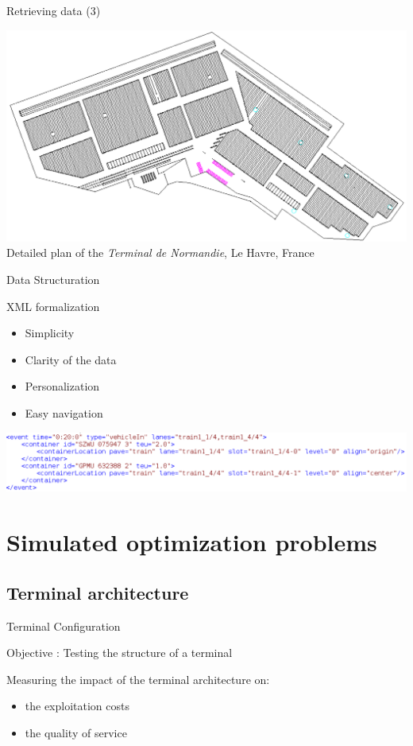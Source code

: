 \documentclass{beamer}
\begin{document}
\begin{frame}{Retrieving data (3)}
   \begin{center}
      \includegraphics[height=.70\textheight]{fig/planTerminalDetailleBlanc.png} \\
       \tiny Detailed plan of the \textit{Terminal de Normandie}, Le Havre, France
    \end{center}
\end{frame} 

\begin{frame}{Data Structuration}
  \begin{block}{XML formalization}
    \begin{itemize}
      \item Simplicity
      \item Clarity of the data
      \item Personalization
      \item Easy navigation
    \end{itemize}
   \end{block}
   
  \begin{center}   
    \includegraphics[width=.90\textwidth]{fig/structureXML.png}
   \end{center}
\end{frame}


\section{Simulated optimization problems}
\subsection*{Terminal architecture}
\begin{frame}{Terminal Configuration}
  \begin{block}{Objective :}
    Testing the structure of a terminal
  \end{block}
  \pause
  Measuring the impact of the terminal architecture on: 
  \begin{itemize}
  \pause
   \item the exploitation costs
  \pause
   \item the quality of service
  \end{itemize}
 \end{frame}
\end{document}
